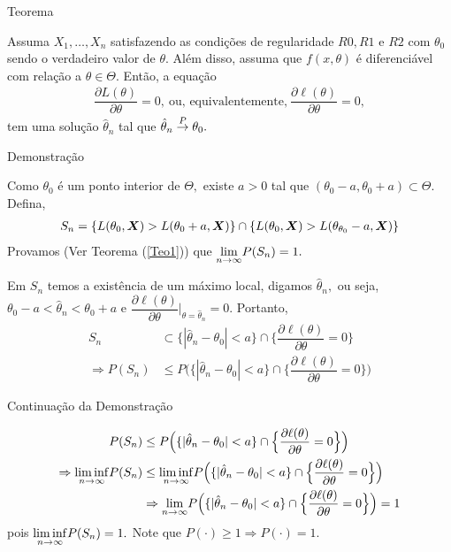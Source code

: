 \documentclass[12pt]{beamer}
\begin{document}
\begin{frame}{Teorema}
\begin{Teorema}\label{Teo3}
\justifying
Assuma $X_{1},\ldots,X_{n}$ satisfazendo as condições de regularidade $R0, R1$ e $R2$ com $\theta_{0}$ sendo o verdadeiro valor de $\theta.$ Além disso, assuma que $f(x,\theta)$ é diferenciável com relação a $\theta\in\Theta.$ Então, a equação 
\begin{align*}
    \dfrac{\partial L(\theta)}{\partial\theta}=0,~\text{ou, equivalentemente,}~\dfrac{\partial\ell(\theta)}{\partial\theta}=0,
\end{align*}
tem uma solução $\hat{\theta}_{n}$ tal que $\hat{\theta}_{n}\overset{P}{\rightarrow} \theta_{0}.$
\end{Teorema}
\end{frame}

\begin{frame}{Demonstração}
\begin{block}{}
\justifying
Como $\theta_{0}$ é um ponto interior de $\Theta,$ existe $a>0$ tal que $(\theta_{0}-a,\theta_{0}+a)\subset\Theta.$ Defina, 
\begin{align*}
    S_{n}=\{L(\theta_{0},\boldsymbol{X})>L(\theta_{0}+a,\boldsymbol{X})\}\cap \{L(\theta_{0},\boldsymbol{X})>L(\theta_{\theta_{0}}-a,\boldsymbol{X})\}
\end{align*}
Provamos (Ver Teorema (\ref{Teo1})) que ${\displaystyle \lim_{n\to\infty}} P(S_{n})=1.$
\end{block}
\begin{block}{}
\justifying
Em $S_{n}$ temos a existência de um máximo local, digamos $\hat{\theta}_{n},$ ou seja, $\theta_{0}-a<\hat{\theta}_{n}<\theta_{0}+a$ e $\dfrac{\partial \ell(\theta)}{\partial\theta}|_{\theta=\hat{\theta}_{n}}=0.$ Portanto, 
\begin{align*}
    S_{n}&\subset \{|\hat{\theta}_{n}-\theta_{0}|<a\}\cap\Big\{\dfrac{\partial \ell(\theta)}{\partial\theta}=0\Big\}\\
    \Rightarrow P(S_{n})&\leq P\Big(\{|\hat{\theta}_{n}-\theta_{0}|<a\}\cap\Big\{\dfrac{\partial \ell(\theta)}{\partial\theta}=0\Big\}\Big)
\end{align*}
\end{block}
\end{frame}

\begin{frame}{Continuação da Demonstração}
\begin{block}{}
\begin{align*}
P(S_{n})&\leq P\Big(\{|\hat{\theta}_{n}-\theta_{0}|<a\}\cap\Big\{\dfrac{\partial \ell(\theta)}{\partial\theta}=0\Big\}\Big)\\
\Rightarrow {\displaystyle \liminf_{n\to\infty}} P(S_{n})&\leq {\displaystyle \liminf_{n\to\infty}} P\Big(\{|\hat{\theta}_{n}-\theta_{0}|<a\}\cap\Big\{\dfrac{\partial \ell(\theta)}{\partial\theta}=0\Big\}\Big)\\
&\Rightarrow {\displaystyle \lim_{n\to\infty}} P\Big(\{|\hat{\theta}_{n}-\theta_{0}|<a\}\cap\Big\{\dfrac{\partial \ell(\theta)}{\partial\theta}=0\Big\}\Big)=1
\end{align*}
pois ${\displaystyle \liminf_{n\to\infty}} P(S_{n})=1.$ Note que $P(\cdot)\geq 1\Rightarrow P(\cdot)=1.$
\end{block}
\end{frame}
\end{document}
